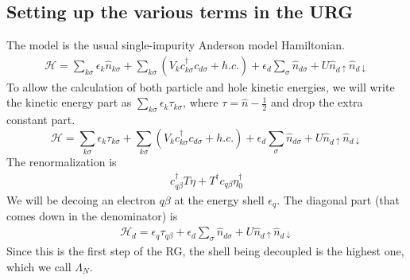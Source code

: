 \documentclass[twoside,11pt]{report}
\numberwithin{equation}{section}
\begin{document}
\subsection{Setting up the various terms in the URG}
The model is the usual single-impurity Anderson model Hamiltonian.
\begin{equation}\begin{aligned}
	\mathcal{H} = \sum_{k\sigma}\epsilon_k \hat n_{k\sigma} + \sum_{k\sigma} \left(V_{k} c^\dagger_{k\sigma} c_{d\sigma} + h.c.\right) + \epsilon_{d}\sum_\sigma  \hat n_{d\sigma} +  U \hat n_{d\uparrow} \hat n_{d\downarrow}
\end{aligned}\end{equation}
To allow the calculation of both particle and hole kinetic energies, we will write the kinetic energy part as \(\sum_{k\sigma}\epsilon_k \tau_{k\sigma}\), where \(\tau = \hat n - \frac{1}{2}\) and drop the extra constant part.
\begin{equation}
	\label{model:siam}
	\mathcal{H} = \sum_{k\sigma}\epsilon_k \tau_{k\sigma} + \sum_{k\sigma} \left(V_{k} c^\dagger_{k\sigma} c_{d\sigma} + h.c.\right) + \epsilon_{d}\sum_\sigma  \hat n_{d\sigma} +  U \hat n_{d\uparrow} \hat n_{d\downarrow}
\end{equation}
The renormalization is
\begin{equation}\begin{aligned}
\label{newh}
c^\dagger_{q\beta}T \eta + T^\dagger c_{q\beta}\eta_0^\dagger
\end{aligned}\end{equation}
We will be decoing an electron \(q\beta\) at the energy shell \(\epsilon_q\). The diagonal part (that comes down in the denominator) is
\begin{equation}\begin{aligned}
	\label{term1}
\mathcal{H}_d = \epsilon_q \tau_{q\beta} + \epsilon_{d}\sum_\sigma  \hat n_{d\sigma} +  U \hat n_{d\uparrow} \hat n_{d\downarrow}
\end{aligned}\end{equation}
Since this is the first step of the RG, the shell being decoupled is the highest one, which we call \(\Lambda_N\).
\end{document}
